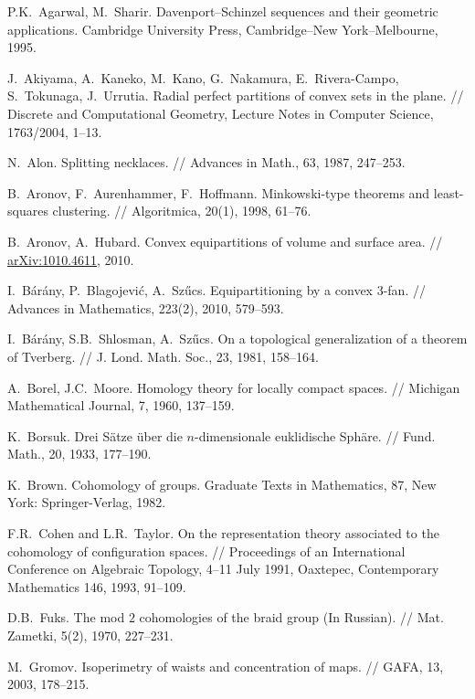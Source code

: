 \documentclass[12pt,a4paper,oneside]{amsart}
\theoremstyle{definition}
\theoremstyle{remark}
\numberwithin{equation}{section}
\begin{document}
\begin{thebibliography}{99}

P.K.~Agarwal, M.~Sharir. Davenport--Schinzel sequences and their geometric applications. Cambridge University Press, Cambridge--New York--Melbourne, 1995.

J.~Akiyama, A.~Kaneko, M.~Kano, G.~Nakamura, E.~Rivera-Campo, S.~Tokunaga, J.~Urrutia. Radial perfect partitions of convex sets in the plane. // Discrete and Computational Geometry, Lecture Notes in Computer Science, 1763/2004, 1--13.

N.~Alon. Splitting necklaces. // Advances in Math., 63, 1987, 247--253.

B.~Aronov, F.~Aurenhammer, F.~Hoffmann. Minkowski-type theorems and least-squares clustering. // Algoritmica, 20(1), 1998, 61--76.

B.~Aronov, A.~Hubard. Convex equipartitions of volume and surface area. // \href{http://arxiv.org/abs/1010.4611}{arXiv:1010.4611}, 2010.

I.~B\'ar\'any, P.~Blagojevi\'c, A.~Sz\H{u}cs. Equipartitioning by a convex $3$-fan. // Advances in Mathematics, 223(2), 2010, 579--593. 

I.~B\'ar\'any, S.B.~Shlosman, A.~Sz\H{u}cs. On a topological generalization of a theorem of Tverberg. // J. Lond. Math. Soc., 23, 1981, 158--164.

A.~Borel, J.C.~Moore. Homology theory for locally compact spaces. // Michigan Mathematical Journal, 7, 1960, 137--159.

K.~Borsuk. Drei S\"atze \"uber die $n$-dimensionale euklidische Sph\"are. // Fund. Math., 20, 1933, 177--190.

K.~Brown. Cohomology of groups. Graduate Texts in Mathematics, 87, New York: Springer-Verlag, 1982.

F.R.~Cohen and L.R.~Taylor. On the representation theory associated to the cohomology of configuration spaces. // Proceedings of an International Conference on Algebraic Topology, 4--11 July 1991, Oaxtepec, Contemporary Mathematics 146, 1993, 91--109.

D.B.~Fuks. The mod $2$ cohomologies of the braid group (In Russian). // Mat. Zametki, 5(2), 1970, 227--231.

M.~Gromov. Isoperimetry of waists and concentration of maps. // GAFA, 13, 2003, 178--215.


\end{thebibliography}
\end{document}
